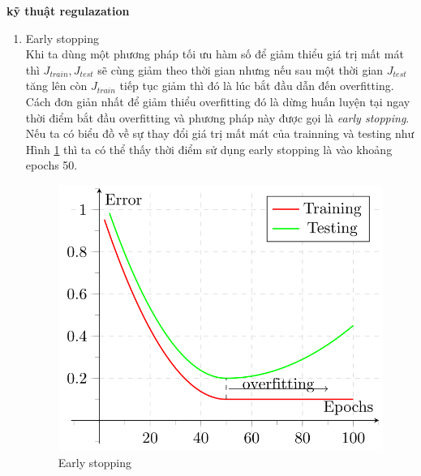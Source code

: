 \textbf{kỹ thuật regulazation}
\begin{enumerate}
\item Early stopping\\
  Khi ta dùng một phương pháp tối ưu hàm số để giảm thiểu giá trị mất mát thì \textit{$J_{train}, J_{test}$} sẽ cùng giảm theo thời gian nhưng nếu sau một thời gian \textit{$J_{test}$} tăng lên còn \textit{$J_{train}$} tiếp tục giảm thì đó là lúc bắt đầu dẫn đến overfitting. Cách đơn giản nhất để giảm thiểu overfitting đó là dừng huấn luyện tại ngay thời điểm bắt đầu overfitting và phương pháp này được gọi là \textit{early stopping}. Nếu ta có biểu đồ về sự thay đổi giá trị mất mát của trainning và testing như Hình \ref{fig:overfittingError} thì ta có thể thấy thời điểm sử dụng early stopping là vào khoảng epochs 50.

\begin{center}
 	\begin{figure}[H]
    \begin{center}
    \includegraphics[scale=0.5]{chap3/image/overfittingError.png}
    \end{center}
    \caption{Early stopping}
    \label{fig:overfittingError}
    \end{figure}
\end{center}


\end{enumerate}
